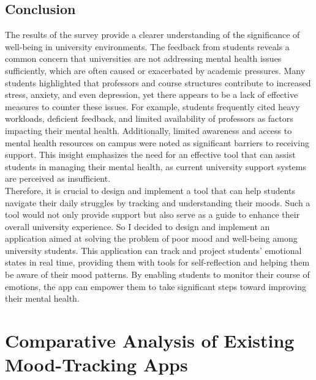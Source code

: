 \subsection{Conclusion}
The results of the survey provide a clearer understanding of the significance of well-being in university environments. The feedback from students reveals a common concern that universities are not addressing mental health issues sufficiently, which are often caused or exacerbated by academic pressures. Many students highlighted that professors and course structures contribute to increased stress, anxiety, and even depression, yet there appears to be a lack of effective measures to counter these issues. For example, students frequently cited heavy workloads, deficient feedback, and limited availability of professors as factors impacting their mental health. Additionally, limited awareness and access to mental health resources on campus were noted as significant barriers to receiving support. This insight emphasizes the need for an effective tool that can assist students in managing their mental health, as current university support systems are perceived as insufficient.\vspace{5mm} \\
Therefore, it is crucial to design and implement a tool that can help students navigate their daily struggles by tracking and understanding their moods. Such a tool would not only provide support but also serve as a guide to enhance their overall university experience. So I decided to design and implement an application aimed at solving the problem of poor mood and well-being among university students. This application can track and project students' emotional states in real time, providing them with tools for self-reflection and helping them be aware of their mood patterns. By enabling students to monitor their course of emotions, the app can empower them to take significant steps toward improving their mental health.

\section{Comparative Analysis of Existing Mood-Tracking Apps}

